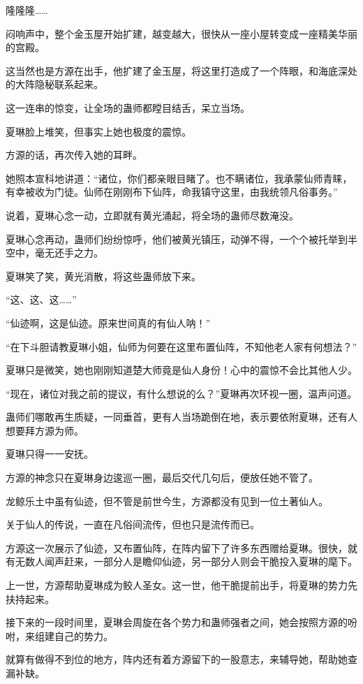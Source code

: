 \begin{this_body}
隆隆隆……

闷响声中，整个金玉屋开始扩建，越变越大，很快从一座小屋转变成一座精美华丽的宫殿。

这当然也是方源在出手，他扩建了金玉屋，将这里打造成了一个阵眼，和海底深处的大阵隐秘联系起来。

这一连串的惊变，让全场的蛊师都瞠目结舌，呆立当场。

夏琳脸上堆笑，但事实上她也极度的震惊。

方源的话，再次传入她的耳畔。

她照本宣科地讲道：“诸位，你们都亲眼目睹了。也不瞒诸位，我承蒙仙师青睐，有幸被收为门徒。仙师在刚刚布下仙阵，命我镇守这里，由我统领凡俗事务。”

说着，夏琳心念一动，立即就有黄光涌起，将全场的蛊师尽数淹没。

夏琳心念再动，蛊师们纷纷惊呼，他们被黄光镇压，动弹不得，一个个被托举到半空中，毫无还手之力。

夏琳笑了笑，黄光消散，将这些蛊师放下来。

“这、这、这……”

“仙迹啊，这是仙迹。原来世间真的有仙人呐！”

“在下斗胆请教夏琳小姐，仙师为何要在这里布置仙阵，不知他老人家有何想法？”

夏琳只是微笑，她也刚刚知道楚大师竟是仙人身份！心中的震惊不会比其他人少。

“现在，诸位对我之前的提议，有什么想说的么？”夏琳再次环视一圈，温声问道。

蛊师们哪敢再生质疑，一同垂首，更有人当场跪倒在地，表示要依附夏琳，还有人想要拜方源为师。

夏琳只得一一安抚。

方源的神念只在夏琳身边逡巡一圈，最后交代几句后，便放任她不管了。

龙鲸乐土中虽有仙迹，但不管是前世今生，方源都没有见到一位土著仙人。

关于仙人的传说，一直在凡俗间流传，但也只是流传而已。

方源这一次展示了仙迹，又布置仙阵，在阵内留下了许多东西赠给夏琳。很快，就有无数人闻声赶来，一部分人是瞻仰仙迹，另一部分人则会干脆投入夏琳的麾下。

上一世，方源帮助夏琳成为鲛人圣女。这一世，他干脆提前出手，将夏琳的势力先扶持起来。

接下来的一段时间里，夏琳会周旋在各个势力和蛊师强者之间，她会按照方源的吩咐，来组建自己的势力。

就算有做得不到位的地方，阵内还有着方源留下的一股意志，来辅导她，帮助她查漏补缺。


\end{this_body}
